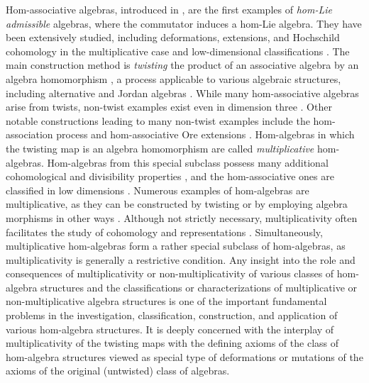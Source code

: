 \documentclass[12pt]{article}
\begin{document}
		Hom-associative algebras, introduced in \cite{ms:homstructure}, are the first examples of \emph{hom-Lie admissible} algebras, where the commutator induces a hom-Lie algebra. They have been extensively studied, including deformations, extensions, and Hochschild cohomology in the multiplicative case \cite{MakSil-formaldefs,Gohr:HAsurj,HurMak:HAcohomology,ArfFraMak:morphisms} and low-dimensional classifications \cite{MakZah:HAclassification}. The main construction method is \emph{twisting} the product of an associative algebra by an algebra homomorphism \cite{Yau:HAhomology}, a process applicable to various algebraic structures, including alternative and Jordan algebras \cite{Mak:HomAltHomJordan}. While many hom-associative algebras arise from twists, non-twist examples exist even in dimension three \cite{MakZah:HAclassification,GarButSil:ZeroDivision}. Other notable constructions leading to many non-twist examples include the hom-association process and hom-associative Ore extensions \cite{BackRic:HAWeyl,BackRicSil:HAOreWeakUnit}. Hom-algebras in which the twisting map is an algebra homomorphism are called \emph{multiplicative} hom-algebras. Hom-algebras from this special subclass possess many additional cohomological and divisibility properties \cite{Yau:HAhomology,AmmEjbMak:cohomology,ArfFraMak:morphisms,Mak:HomAltHomJordan,GarButKitSil:divisibility}, and the hom-associative ones are classified in low dimensions \cite{MakZah:HAclassification}. Numerous examples of hom-algebras are multiplicative, as they can be constructed by twisting \cite{Yau:HAhomology} or by employing algebra morphisms in other ways \cite{BackRic:HAWeyl,BackRicSil:HAOreWeakUnit}.
		Although not strictly necessary, multiplicativity often facilitates the study of cohomology and representations \cite{AmmEjbMak:cohomology,ArfFraMak:morphisms,Mak:HomAltHomJordan}. Simultaneously, multiplicative hom-algebras form a rather special subclass of hom-algebras, as multiplicativity is generally a restrictive condition. Any insight into the role and consequences of multiplicativity or non-multiplicativity of various classes of hom-algebra structures and the classifications or characterizations of multiplicative or non-multiplicative algebra structures is one of the important fundamental problems in the investigation, classification, construction, and application of various hom-algebra structures. It is deeply concerned with the interplay of multiplicativity of the twisting maps with the defining axioms of the class of hom-algebra structures viewed as special type of
		deformations or mutations of the axioms of the original (untwisted) class of algebras.
		
\end{document}
